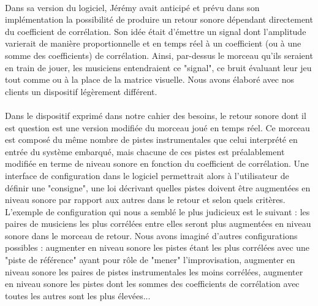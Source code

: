 \paragraph{}
Dans sa version du logiciel, Jérémy avait anticipé et prévu dans son
implémentation la possibilité de produire un retour sonore dépendant
directement du coefficient de corrélation. Son idée était d'émettre un
signal dont l'amplitude varierait de manière proportionnelle et en
temps réel à un coefficient (ou à une somme des coefficients) de
corrélation. Ainsi, par-dessus le morceau qu'ils seraient en train de
jouer, les musiciens entendraient ce "signal", ce bruit évaluant
leur jeu tout comme ou à la place de la matrice visuelle. Nous
avons élaboré avec nos clients un dispositif légèrement différent.
\paragraph{}
Dans le dispositif exprimé dans notre cahier des besoins, le retour
sonore dont il est question est une version modifiée du morceau joué
en temps réel. Ce morceau est composé du même nombre de pistes
instrumentales que celui interprété en entrée du système embarqué,
mais chacune de ces pistes est préalablement modifiée en terme de
niveau sonore en fonction du coefficient de corrélation. Une interface
de configuration dans le logiciel permettrait alors à l'utilisateur de
définir une "consigne", une loi décrivant quelles pistes doivent
être augmentées en niveau sonore par rapport aux autres dans le retour
et selon quels critères. L'exemple de configuration qui nous a semblé
le plus judicieux est le suivant : les paires de musiciens les plus
corrélées entre elles seront plus augmentées en niveau sonore dans le
morceau de retour. Nous avons imaginé d'autres configurations
possibles : augmenter en niveau sonore les pistes étant les plus
corrélées avec une "piste de référence" ayant pour rôle de "mener"
l'improvisation, augmenter en niveau sonore les paires de pistes
instrumentales les moins corrélées, augmenter en niveau sonore les
pistes dont les sommes des coefficients de corrélation avec toutes les
autres sont les plus élevées...
